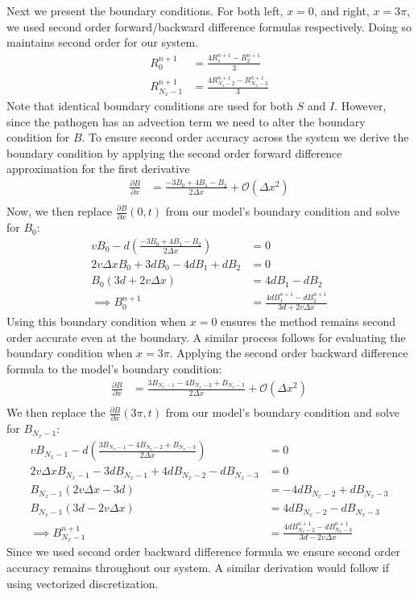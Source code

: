 Next we present the boundary conditions. For both left, $x =0$, and right, $x=3 \pi$, we used second order forward/backward difference formulas respectively. Doing so maintains second order for our system. 
\begin{align}
    R^{n+1}_0 &= \frac{4 R^{n+1}_1 - R^{n+1}_2}{3} \\
    R^{n+1}_{N_x -1} &= \frac{4 R^{n+1}_{N_x -2} - R^{n+1}_{N_x -3}}{3} 
\end{align}
Note that identical boundary conditions are used for both $S$ and $I$. However, since the pathogen has an advection term we need to alter the boundary condition for $B$. To ensure second order accuracy across the system we derive the boundary condition by applying the second order forward difference approximation for the first derivative
\begin{align}
    \frac{\partial B}{\partial x}  &= \frac{-3B_0 + 4B_1 - B_2}{2\Delta x} + \mathcal{O}(\Delta x^2) \\
\end{align}
Now, we then replace $ \frac{\partial B}{\partial x}(0,t)$ from our model's boundary condition and solve for $B_0$:
\begin{align}
        v B_0 - d \left( \frac{-3B_0 + 4B_1 - B_2}{2\Delta x} \right) &= 0 \\
        2v\Delta x B_0 + 3d B_0 - 4d B_1 + d B_2 &= 0 \\
        B_0 (3d + 2v\Delta x) &= 4d B_1 - d B_2 \\
        \implies B^{n+1}_0 &= \frac{4d B^{n+1}_1 - d B^{n+1}_2}{3d + 2v\Delta x}
\end{align}
Using this boundary condition when $x = 0$ ensures the method remains second order accurate even at the boundary. A similar process follows for evaluating the boundary condition when $x = 3\pi$. Applying the second order backward difference formula to the model's boundary condition:
\begin{align}
    \frac{\partial B}{\partial x}  &= \frac{3B_{N_x - 1} - 4B_{N_x - 2} + B_{N_x - 3}}{2\Delta x} + \mathcal{O}(\Delta x^2) \\
\end{align}
We then replace the $ \frac{\partial B}{\partial x}(3 \pi,t)$ from our model's boundary condition and solve for $B_{N_x -1}$:
\begin{align}
    v B_{N_x - 1} - d \left( \frac{3B_{N_x - 1} - 4B_{N_x - 2} + B_{N_x - 3}}{2\Delta x} \right) &= 0 \\
    2v\Delta x B_{N_x - 1} - 3d B_{N_x - 1} + 4d B_{N_x - 2} - d B_{N_x - 3} &= 0 \\
    B_{N_x - 1} (2v\Delta x - 3d) &= -4d B_{N_x - 2} + d B_{N_x - 3} \\
    B_{N_x - 1} (3d - 2v\Delta x) &= 4d B_{N_x - 2} - d B_{N_x - 3} \\
    \implies B^{n+1}_{N_x - 1} &= \frac{4d B^{n+1}_{N_x - 2} - d B^{n+1}_{N_x - 3}}{3d - 2v\Delta x}
\end{align}
Since we used second order backward difference formula we ensure second order accuracy remains throughout our system. A similar derivation would follow if using vectorized discretization. 


